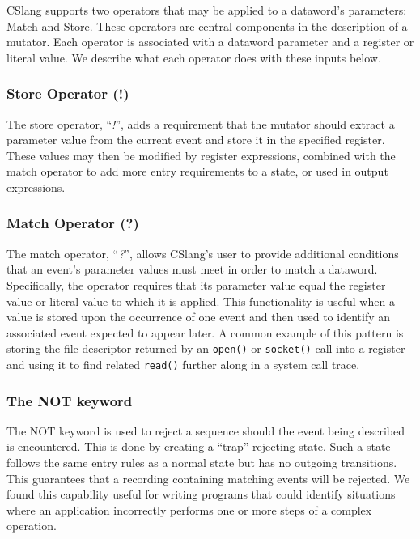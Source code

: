 CSlang supports two operators that may be applied to a dataword's
parameters: Match and Store.  These operators are central components in
the description of a mutator.  Each operator is associated with a dataword
parameter and a register or literal value.  We describe what each operator
does with these inputs below.

\subsubsection{Store Operator (!)}

The store operator, ``\textit{!}'', adds a requirement that the
mutator should extract a parameter value from the current event and store
it in the specified register.  These values may then be modified by
register expressions, combined with the match operator to add more
entry requirements to a state, or used in output expressions.

\subsubsection{Match Operator (?)}

The match operator, ``\textit{?}'',
allows CSlang's user
to provide additional conditions
that an event's parameter values must meet
in order to match a dataword.
Specifically,
the operator requires
that its parameter value equal the
register value
or literal value
to which it is applied.
This functionality is
useful when a value is stored upon the occurrence of one event
and then used to identify an associated event expected to appear later.
A common example of this pattern is storing the file descriptor
returned by an {\tt open()} or {\tt socket()} call into a register
and using it to find related {\tt read()} further along in a system call
trace.

\subsubsection{The NOT keyword}
\label{subsub:NOT}

The NOT keyword is used to reject a sequence should the event being
described is encountered.  This is done by creating a ``trap''
rejecting state.  Such a state follows the same entry rules
as a normal state but has no outgoing transitions.  This guarantees that a
recording containing matching events will be rejected.
We found this capability useful for writing programs that could identify
situations where an application incorrectly performs one or more steps of a
complex operation.




